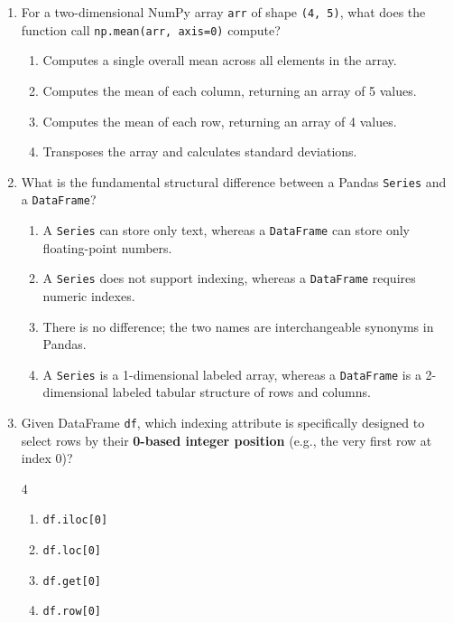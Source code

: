 \documentclass[11pt,a4paper]{article}
\begin{document}
\newpage
\begin{enumerate}[leftmargin=*,itemsep=2.5pt,resume]

\item For a two-dimensional NumPy array \texttt{arr} of shape \texttt{(4, 5)}, what does the function call \texttt{np.mean(arr, axis=0)} compute?
\begin{enumerate}[label=\Alph*.]
  \item Computes a single overall mean across all elements in the array.
  \item Computes the mean of each column, returning an array of 5 values.
  \item Computes the mean of each row, returning an array of 4 values.
  \item Transposes the array and calculates standard deviations.
\end{enumerate}

\item What is the fundamental structural difference between a Pandas \texttt{Series} and a \texttt{DataFrame}?
\begin{enumerate}[label=\Alph*.]
  \item A \texttt{Series} can store only text, whereas a \texttt{DataFrame} can store only floating-point numbers.
  \item A \texttt{Series} does not support indexing, whereas a \texttt{DataFrame} requires numeric indexes.
  \item There is no difference; the two names are interchangeable synonyms in Pandas.
  \item A \texttt{Series} is a 1-dimensional labeled array, whereas a \texttt{DataFrame} is a 2-dimensional labeled tabular structure of rows and columns.
\end{enumerate}

\item Given DataFrame \texttt{df}, which indexing attribute is specifically designed to select rows by their \textbf{0-based integer position} (e.g., the very first row at index 0)?
\begin{multicols}{4}
\begin{enumerate}[label=\Alph*.]
  \item \texttt{df.iloc[0]}
  \item \texttt{df.loc[0]}
  \item \texttt{df.get[0]}
  \item \texttt{df.row[0]}
\end{enumerate}
\end{multicols}


\end{enumerate}
\end{document}
